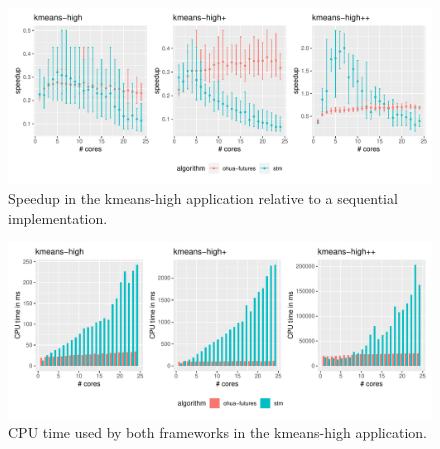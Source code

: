 \begin{figure}
    \centering
    \includegraphics[width=\textwidth,keepaspectratio]{gfx/results/kmeans-high_comb}
    \caption{Speedup in the kmeans-high application relative to a sequential implementation.}%
    \label{fig:evaluation:kmeans-high}
\end{figure}

\begin{figure}
    \centering
    \includegraphics[width=\textwidth,keepaspectratio]{gfx/results/cpu_kmeans-high_comb}
    \caption{CPU time used by both frameworks in the kmeans-high application.}%
    \label{fig:evaluation:kmeans-high-cpu}
\end{figure}

